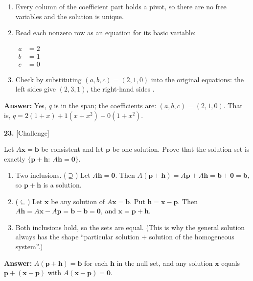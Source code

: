 \documentclass[11pt]{article}
\begin{document}
\begin{tcolorbox}[breakable,colback=ans,colframe=ansb,boxrule=0.5pt,left=4pt,right=4pt,top=2pt,bottom=2pt]
\begin{enumerate}[leftmargin=2.2em,itemsep=1pt,topsep=1pt,label=\textbf{Step \arabic*.}]
\item Every column of the coefficient part holds a pivot, so there are no free variables and the solution is unique.
\item Read each nonzero row as an equation for its basic variable:\par\smallskip $\displaystyle\begin{aligned}a&=2\\ b&=1\\ c&=0\end{aligned}$
\item Check by substituting $(a,b,c)=(2,1,0)$ into the original equations: the left sides give $(2,3,1)$, the right-hand sides \checkmark.
\end{enumerate}\textbf{Answer:} Yes, $q$ is in the span; the coefficients are: $(a,b,c)=(2,1,0)$. That is, $q=2(1+x)+1(x+x^{2})+0(1+x^{2})$.\end{tcolorbox}
\par\vspace{2pt}
\begin{minipage}{\linewidth}\textbf{23.} \hfill{\scriptsize\color{ink}[Challenge]}\par\nopagebreak Let $A\mathbf x=\mathbf b$ be consistent and let $\mathbf p$ be one solution. Prove that the solution set is exactly $\{\mathbf p+\mathbf h:\ A\mathbf h=\mathbf 0\}$.
\end{minipage}\par\nopagebreak
\begin{tcolorbox}[breakable,colback=ans,colframe=ansb,boxrule=0.5pt,left=4pt,right=4pt,top=2pt,bottom=2pt]\begin{enumerate}[leftmargin=2.2em,itemsep=1pt,topsep=1pt,label=\textbf{Step \arabic*.}]\item Two inclusions. ($\supseteq$) Let $A\mathbf h=\mathbf 0$. Then $A(\mathbf p+\mathbf h)=A\mathbf p+A\mathbf h=\mathbf b+\mathbf 0=\mathbf b$, so $\mathbf p+\mathbf h$ is a solution.
\item ($\subseteq$) Let $\mathbf x$ be any solution of $A\mathbf x=\mathbf b$. Put $\mathbf h=\mathbf x-\mathbf p$. Then $A\mathbf h=A\mathbf x-A\mathbf p=\mathbf b-\mathbf b=\mathbf 0$, and $\mathbf x=\mathbf p+\mathbf h$.
\item Both inclusions hold, so the sets are equal. (This is why the general solution always has the shape ``particular solution $+$ solution of the homogeneous system''.)
\end{enumerate}\textbf{Answer:} $A(\mathbf p+\mathbf h)=\mathbf b$ for each $\mathbf h$ in the null set, and any solution $\mathbf x$ equals $\mathbf p+(\mathbf x-\mathbf p)$ with $A(\mathbf x-\mathbf p)=\mathbf 0$.\end{tcolorbox}
\end{document}
